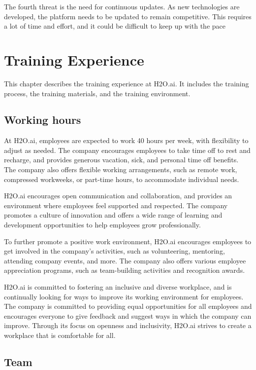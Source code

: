 \documentclass[12pt,a4paper]{report}
\begin{document}
The fourth threat is the need for continuous updates. As new technologies are developed, the platform needs to be updated to remain competitive. This requires a lot of time and effort, and it could be difficult to keep up with the pace

\chapter{Training Experience}

This chapter describes the training experience at H2O.ai. It includes the training process, the training materials, and the training environment.


\section{Working hours}
At H2O.ai, employees are expected to work 40 hours per week, with flexibility to adjust as needed. The company encourages employees to take time off to rest and recharge, and provides generous vacation, sick, and personal time off benefits. The company also offers flexible working arrangements, such as remote work, compressed workweeks, or part-time hours, to accommodate individual needs.

H2O.ai encourages open communication and collaboration, and provides an environment where employees feel supported and respected. The company promotes a culture of innovation and offers a wide range of learning and development opportunities to help employees grow professionally.

To further promote a positive work environment, H2O.ai encourages employees to get involved in the company's activities, such as volunteering, mentoring, attending company events, and more. The company also offers various employee appreciation programs, such as team-building activities and recognition awards.

H2O.ai is committed to fostering an inclusive and diverse workplace, and is continually looking for ways to improve its working environment for employees. The company is committed to providing equal opportunities for all employees and encourages everyone to give feedback and suggest ways in which the company can improve. Through its focus on openness and inclusivity, H2O.ai strives to create a workplace that is comfortable for all.

\section{Team}
\end{document}
